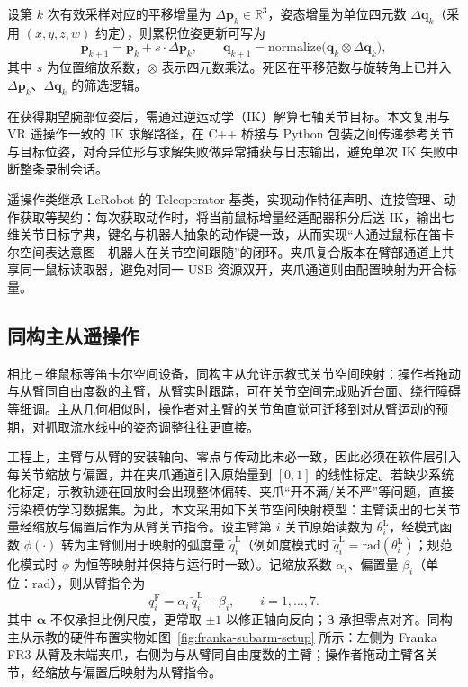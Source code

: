 设第 $k$ 次有效采样对应的平移增量为 $\Delta \mathbf{p}_k \in \mathbb{R}^3$，姿态增量为单位四元数 $\Delta \mathbf{q}_k$（采用 $(x,y,z,w)$ 约定），则累积位姿更新可写为
\begin{equation}
  \mathbf{p}_{k+1} = \mathbf{p}_k + s \cdot \Delta \mathbf{p}_k ,
  \qquad
  \mathbf{q}_{k+1} = \mathrm{normalize}\bigl(\mathbf{q}_k \otimes \Delta \mathbf{q}_k\bigr),
  \label{eq:spacemouse-pose}
\end{equation}
其中 $s$ 为位置缩放系数，$\otimes$ 表示四元数乘法。死区在平移范数与旋转角上已并入 $\Delta \mathbf{p}_k$、$\Delta \mathbf{q}_k$ 的筛选逻辑。

在获得期望腕部位姿后，需通过逆运动学（IK）解算七轴关节目标。本文复用与 VR 遥操作一致的 IK 求解路径，在 C++ 桥接与 Python 包装之间传递参考关节与目标位姿，对奇异位形与求解失败做异常捕获与日志输出，避免单次 IK 失败中断整条录制会话。

遥操作类继承 LeRobot 的 Teleoperator 基类，实现动作特征声明、连接管理、动作获取等契约：每次获取动作时，将当前鼠标增量经适配器积分后送 IK，输出七维关节目标字典，键名与机器人抽象的动作键一致，从而实现“人通过鼠标在笛卡尔空间表达意图—机器人在关节空间跟随”的闭环。夹爪复合版本在臂部通道上共享同一鼠标读取器，避免对同一 USB 资源双开，夹爪通道则由配置映射为开合标量。

\subsection{同构主从遥操作}
\label{sec:subarm}

相比三维鼠标等笛卡尔空间设备，同构主从允许示教式关节空间映射：操作者拖动与从臂同自由度数的主臂，从臂实时跟踪，可在关节空间完成贴近台面、绕行障碍等细调。主从几何相似时，操作者对主臂的关节角直觉可迁移到对从臂运动的预期，对抓取流水线中的姿态调整往往更直接。

工程上，主臂与从臂的安装轴向、零点与传动比未必一致，因此必须在软件层引入每关节缩放与偏置，并在夹爪通道引入原始量到 $[0,1]$ 的线性标定。若缺少系统化标定，示教轨迹在回放时会出现整体偏转、夹爪“开不满/关不严”等问题，直接污染模仿学习数据集。为此，本文采用如下关节空间映射模型：主臂读出的七关节量经缩放与偏置后作为从臂关节指令。设主臂第 $i$ 关节原始读数为 $\theta^{\mathrm{L}}_i$，经模式函数 $\phi(\cdot)$ 转为主臂侧用于映射的弧度量 $\tilde{q}^{\mathrm{L}}_i$（例如度模式时 $\tilde{q}^{\mathrm{L}}_i=\mathrm{rad}(\theta^{\mathrm{L}}_i)$；规范化模式时 $\phi$ 为恒等映射并保持与运行时一致）。记缩放系数 $\alpha_i$、偏置量 $\beta_i$（单位：rad），则从臂指令为
\begin{equation}
  q^{\mathrm{F}}_i = \alpha_i \, \tilde{q}^{\mathrm{L}}_i + \beta_i ,
  \qquad i=1,\ldots,7.
  \label{eq:subarm-map}
\end{equation}
其中 $\boldsymbol{\alpha}$ 不仅承担比例尺度，更常取 $\pm1$ 以修正轴向反向；$\boldsymbol{\beta}$ 承担零点对齐。同构主从示教的硬件布置实物如图~\ref{fig:franka-subarm-setup} 所示：左侧为 Franka FR3 从臂及末端夹爪，右侧为与从臂同自由度数的主臂；操作者拖动主臂各关节，经缩放与偏置后映射为从臂指令。

